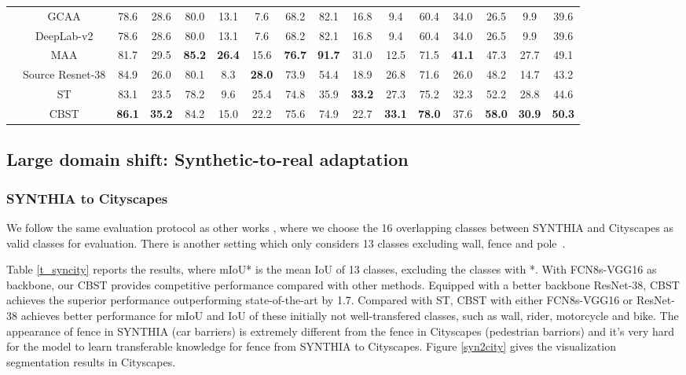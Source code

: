 \documentclass[runningheads]{llncs}
\begin{document}
\begin{table*}[!t]
{\begin{tabular}{c|c|ccccccccccccc|c}
                        & GCAA \cite{Chen_2017_ICCV}            & 78.6 & 28.6 & 80.0  & 13.1 & 7.6  & 68.2 & 82.1 & 16.8 & 9.4   & 60.4 & 34.0 & 26.5  & 9.9  & 39.6 \\ \cline{2-16}
                        & DeepLab-v2 \cite{tsai2018learning} & 78.6 & 28.6 & 80.0 & 13.1 & 7.6 & 68.2 & 82.1 & 16.8 & 9.4 & 60.4 & 34.0 & 26.5 & 9.9 & 39.6 \\
& MAA \cite{tsai2018learning}     &  81.7 & 29.5 & \textbf{85.2} & \textbf{26.4} & 15.6 & \textbf{76.7} & \textbf{91.7} & 31.0 & 12.5 & 71.5 & \textbf{41.1} & 47.3 & 27.7 & 49.1 \\  \cline{2-16}
                        & Source Resnet-38 & 84.9 & 26.0 & 80.1  & 8.3  & \textbf{28.0} & 73.9 & 54.4 & 18.9 & 26.8  & 71.6 & 26.0 & 48.2  & 14.7 & 43.2 \\
                        & ST               & 83.1 & 23.5 & 78.2  & 9.6  & 25.4 & 74.8 & 35.9 & \textbf{33.2} & 27.3 & 75.2 & 32.3 & 52.2  & 28.8 & 44.6 \\
                        & CBST             & \textbf{86.1} & \textbf{35.2} & 84.2 & 15.0 & 22.2 & 75.6 & 74.9 & 22.7 & \textbf{33.1} & \textbf{78.0} & 37.6 & \textbf{58.0} & \textbf{30.9} & \textbf{50.3} \\ \hline
\end{tabular}}
\end{table*}

\subsection{Large domain shift: Synthetic-to-real adaptation}
\subsubsection{SYNTHIA to Cityscapes}
We follow the same evaluation protocol as other works \cite{hoffman2016fcns,Zhang_2017_ICCV}, where we choose the 16 overlapping classes between SYNTHIA and Cityscapes as valid classes for evaluation. There is another setting which only considers 13 classes excluding wall, fence and pole~\cite{tsai2018learning}.

Table \ref{t_syncity} reports the results, where mIoU* is the mean IoU of 13 classes, excluding the classes with *. With FCN8s-VGG16 as backbone, our CBST provides competitive performance compared with other methods. Equipped with a better backbone ResNet-38, CBST achieves the superior performance outperforming state-of-the-art by 1.7. Compared with ST, CBST with either FCN8s-VGG16 or ResNet-38 achieves better performance for mIoU and IoU of these initially not well-transfered classes, such as wall, rider, motorcycle and bike. The appearance of fence in SYNTHIA (car barriers) is extremely different from the fence in Cityscapes (pedestrian barriors) and it's very hard for the model to learn transferable knowledge for fence from SYNTHIA to Cityscapes. Figure \ref{syn2city} gives the visualization segmentation results in Cityscapes.
\end{document}
